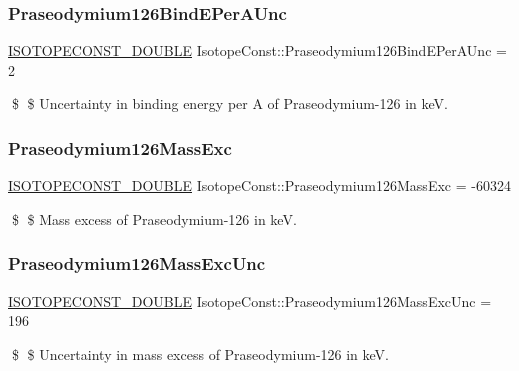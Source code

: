 \subsubsection{\texorpdfstring{Praseodymium126\+Bind\+E\+Per\+A\+Unc}{Praseodymium126BindEPerAUnc}}
{\footnotesize\ttfamily \mbox{\hyperlink{group___isotope_const-_macros_ga8f45a7272ce02c0b4c65c44636ed719a}{I\+S\+O\+T\+O\+P\+E\+C\+O\+N\+S\+T\+\_\+\+D\+O\+U\+B\+LE}} Isotope\+Const\+::\+Praseodymium126\+Bind\+E\+Per\+A\+Unc = 2}

\$ \$ Uncertainty in binding energy per A of Praseodymium-\/126 in keV. \mbox{\label{group___isotope_const-_praseodymium-_pr126_ga59c60e708bb0769179798750cf4da263}} 
\subsubsection{\texorpdfstring{Praseodymium126\+Mass\+Exc}{Praseodymium126MassExc}}
{\footnotesize\ttfamily \mbox{\hyperlink{group___isotope_const-_macros_ga8f45a7272ce02c0b4c65c44636ed719a}{I\+S\+O\+T\+O\+P\+E\+C\+O\+N\+S\+T\+\_\+\+D\+O\+U\+B\+LE}} Isotope\+Const\+::\+Praseodymium126\+Mass\+Exc = -\/60324}

\$ \$ Mass excess of Praseodymium-\/126 in keV. \mbox{\label{group___isotope_const-_praseodymium-_pr126_ga0bf9570897edf7e30af1196ad041febf}} 
\subsubsection{\texorpdfstring{Praseodymium126\+Mass\+Exc\+Unc}{Praseodymium126MassExcUnc}}
{\footnotesize\ttfamily \mbox{\hyperlink{group___isotope_const-_macros_ga8f45a7272ce02c0b4c65c44636ed719a}{I\+S\+O\+T\+O\+P\+E\+C\+O\+N\+S\+T\+\_\+\+D\+O\+U\+B\+LE}} Isotope\+Const\+::\+Praseodymium126\+Mass\+Exc\+Unc = 196}

\$ \$ Uncertainty in mass excess of Praseodymium-\/126 in keV. \mbox{\label{group___isotope_const-_praseodymium-_pr126_ga733e881bff9ec484a5390ee689631e96}} 
